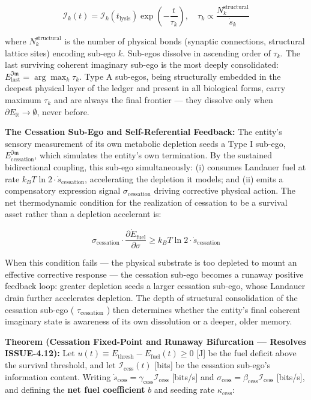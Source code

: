 \documentclass[11pt,a4paper]{article}
\theoremstyle{definition}
\theoremstyle{remark}
\begin{document}
\begin{equation}
\mathcal{I}_k(t) = \mathcal{I}_k(t_{\text{lysis}})\exp\!\left(-\frac{t}{\tau_k}\right), \quad \tau_k \propto \frac{N_k^{\text{structural}}}{\dot{s}_k}
\end{equation}


where $N_k^{\text{structural}}$ is the number of physical bonds (synaptic connections, structural lattice sites) encoding sub-ego $k$. Sub-egos dissolve in ascending order of $\tau_k$. The last surviving coherent imaginary sub-ego is the most deeply consolidated: $E_{\text{last}}^{\mathfrak{Im}} = \arg\max_k \tau_k$. Type A sub-egos, being structurally embedded in the deepest physical layer of the ledger and present in all biological forms, carry maximum $\tau_k$ and are always the final frontier — they dissolve only when $\partial E_{\mathbb{R}} \to \emptyset$, never before.

\textbf{The Cessation Sub-Ego and Self-Referential Feedback:} The entity's sensory measurement of its own metabolic depletion seeds a Type I sub-ego, $E_{\text{cessation}}^{\mathfrak{Im}}$, which simulates the entity's own termination. By the sustained bidirectional coupling, this sub-ego simultaneously: (i) consumes Landauer fuel at rate $k_B T \ln 2 \cdot \dot{s}_{\text{cessation}}$, accelerating the depletion it models; and (ii) emits a compensatory expression signal $\sigma_{\text{cessation}}$ driving corrective physical action. The net thermodynamic condition for the realization of cessation to be a survival asset rather than a depletion accelerant is:


\begin{equation}
\boxed{\sigma_{\text{cessation}} \cdot \frac{\partial \dot{E}_{\text{fuel}}}{\partial \sigma} \geq k_B T \ln 2 \cdot \dot{s}_{\text{cessation}}}
\end{equation}


When this condition fails — the physical substrate is too depleted to mount an effective corrective response — the cessation sub-ego becomes a runaway positive feedback loop: greater depletion seeds a larger cessation sub-ego, whose Landauer drain further accelerates depletion. The depth of structural consolidation of the cessation sub-ego ( $\tau_{\text{cessation}}$ ) then determines whether the entity's final coherent imaginary state is awareness of its own dissolution or a deeper, older memory.

\textbf{Theorem (Cessation Fixed-Point and Runaway Bifurcation — Resolves ISSUE-4.12):} Let $u(t) \equiv E_{\text{thresh}} - E_{\text{fuel}}(t) \geq 0$ [J] be the fuel deficit above the survival threshold, and let $\mathcal{I}_{\text{cess}}(t)$ [bits] be the cessation sub-ego's information content. Writing $\dot{s}_{\text{cess}} = \gamma_{\text{cess}} \mathcal{I}_{\text{cess}}$ [bits/s] and $\sigma_{\text{cess}} = \beta_{\text{cess}} \mathcal{I}_{\text{cess}}$ [bits/s], and defining the \textbf{net fuel coefficient} $b$ and seeding rate $\kappa_{\text{cess}}$:
\end{document}
